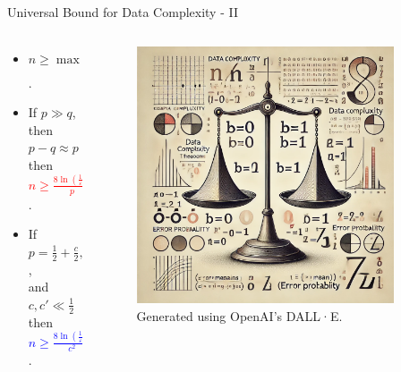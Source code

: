 \begin{frame}{Universal Bound for Data Complexity - II}
\setlength{\columnsep}{1em} %
\begin{columns}[t] %
  \begin{column}{0.6\textwidth}
    \begin{itemize}
      \item $n \geq \max\left(\frac{2(3q + p)\ln\left(\frac{1}{\varepsilon}\right)}{(p - q)^2}, \; \frac{8p \ln\left(\frac{1}{\varepsilon}\right)}{(p - q)^2}\right)$.
      \item If $p \gg q$, then $p - q \approx p$ then \textcolor{red}{$n \geq \frac{8 \ln\left(\frac{1}{\varepsilon}\right)}{p}$}.
      \item If $p = \frac{1}{2} + \frac{c}{2}, q = \frac{1}{2} + \frac{c'}{2}, c \gg c'$, \\and $c, c' \ll \frac{1}{2}$ then \textcolor{blue}{$n \geq \frac{8 \ln\left(\frac{1}{\varepsilon}\right)}{c^{2}}$}.
    \end{itemize}
  \end{column}
  \begin{column}{0.4\textwidth}
    \vspace{-0.4cm}
    \centering
    \begin{figure}
    \includegraphics[width=0.9\textwidth]{./figures/fiarscale.png}
    \tiny{Generated using OpenAI's DALL·E.}
    \end{figure}
  \end{column}
\end{columns}
\end{frame}

